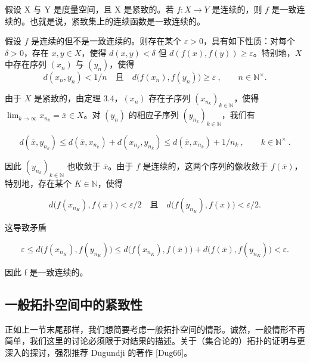\begin{theorem}

假设 X 与 Y 是度量空间，且 X 是紧致的。若 $f: X \to Y$ 是连续的，则 $f$ 是一致连续的。也就是说，紧致集上的连续函数是一致连续的。

\proofhead
假设 $f$ 是连续的但不是一致连续的。则存在某个 $\varepsilon > 0$，具有如下性质：对每个 $\delta > 0$，存在 $x, y \in X$，使得 $d(x, y) < \delta$ 但 $d(f(x), f(y)) \geq \varepsilon$。特别地，$X$ 中存在序列 $(x_n)$ 与 $(y_n)$，使得
\[
d(x_{n},y_{n})<1/n\quad\text{且}\quad d\bigl(f(x_{n}),f(y_{n})\bigr)\geq\varepsilon~,\qquad n\in\mathbb{N}^{\times}.
\]

由于 $X$ 是紧致的，由定理 3.4，$(x_n)$ 存在子序列 $(x_{n_k})_{k\in\mathbb{N}}$，使得 $\lim_{k\to\infty}x_{n_k}=\overline{x}\in X$。对 $(y_n)$ 的相应子序列 $(y_{n_k})_{k\in\mathbb{N}}$，我们有

\[
d(\overline{{x}},y_{n_{k}})\leq d(\overline{{x}},x_{n_{k}})+d(x_{n_{k}},y_{n_{k}})\leq d(\overline{{x}},x_{n_{k}})+1/n_{k}~,\qquad k\in\mathbb{N}^{\times}~.
\]

因此 $(y_{n_k})_{k \in \mathbb{N}}$ 也收敛于 $\overline{x}$。由于 $f$ 是连续的，这两个序列的像收敛于 $f(\overline{x})$，特别地，存在某个 $K \in \mathbb{N}$，使得

\[
d\big(f(x_{n_{K}}),f(\overline{{x}})\big)<\varepsilon/2\quad\text{且}\quad d\big(f(y_{n_{K}}),f(\overline{{x}})\big)<\varepsilon/2.
\]

这导致矛盾

\[
\varepsilon\leq d\big(f(x_{n_{K}}),f(y_{n_{K}})\big)\leq d\big(f(x_{n_{K}}),f(\overline{{x}})\big)+d\big(f(\overline{{x}}),f(y_{n_{K}})\big)<\varepsilon.
\]

因此 f 是一致连续的。

\end{theorem}

\subsection*{一般拓扑空间中的紧致性}

正如上一节末尾那样，我们想简要考虑一般拓扑空间的情形。诚然，一般情形不再简单，我们这里的讨论必须限于对结果的描述。关于（集合论的）拓扑的证明与更深入的探讨，强烈推荐 Dugundji 的著作 [Dug66]。

